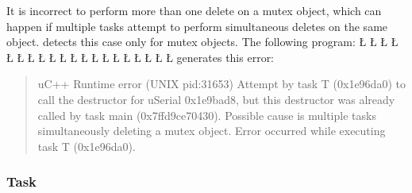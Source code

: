 \documentclass[openright,twoside]{report}
\begin{document}
It is incorrect to perform more than one delete on a mutex object, which can happen if multiple tasks attempt to perform simultaneous deletes on the same object.
\uC detects this case only for mutex objects.
The following program:
\LGinlinefalse\LGbegin\lgrinde
\L{}
\L{\LB{}}
\L{}
\L{\LB{}}
\L{\LB{}}
\CE{}\L{\LB{}}
\L{\LB{\};}}
\endlgrinde\LGend
\LGinlinefalse\LGbegin\lgrinde
\L{}
\L{\LB{}}
\L{\LB{}}
\L{\LB{}}
\CE{}\L{\LB{}}
\L{}
\L{\LB{}}
\L{\LB{\};}}
\endlgrinde\LGend
\LGinlinefalse\LGbegin\lgrinde
\L{}
\L{\LB{}}
\CE{}\L{\LB{}}
\CE{}\L{\LB{}}
\CE{}\L{\LB{\}}}
\endlgrinde\LGend
generates this error:
\begin{quote}
\BGfont
uC++ Runtime error (UNIX pid:31653) Attempt by task T (0x1e96da0) to call the destructor for uSerial 0x1e9bad8, but this destructor was already called by task main (0x7ffd9ce70430).
Possible cause is multiple tasks simultaneously deleting a mutex object.
Error occurred while executing task T (0x1e96da0).
\end{quote}


\subsubsection{Task}
\end{document}
